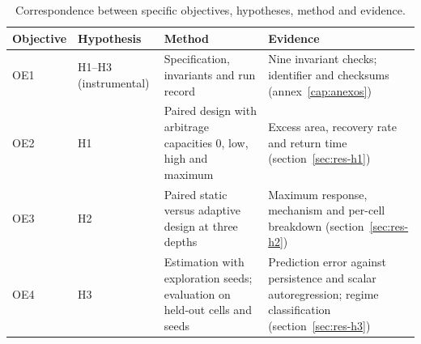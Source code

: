 \begin{table}[htbp]
\centering
\caption{Correspondence between specific objectives, hypotheses, method and evidence.}
\label{tab:oe-h}
\small
\begin{tabularx}{\textwidth}{@{}l l >{\raggedright\arraybackslash}X >{\raggedright\arraybackslash}X@{}}
\toprule
Objective & Hypothesis & Method & Evidence \\
\midrule
OE1 & H1--H3 (instrumental) & Specification, invariants and run record & Nine invariant checks; identifier and checksums (annex~\ref{cap:anexos}) \\
OE2 & H1 & Paired design with arbitrage capacities 0, low, high and maximum & Excess area, recovery rate and return time (section~\ref{sec:res-h1}) \\
OE3 & H2 & Paired static versus adaptive design at three depths & Maximum response, mechanism and per-cell breakdown (section~\ref{sec:res-h2}) \\
OE4 & H3 & Estimation with exploration seeds; evaluation on held-out cells and seeds & Prediction error against persistence and scalar autoregression; regime classification (section~\ref{sec:res-h3}) \\
\bottomrule
\end{tabularx}
\end{table}

